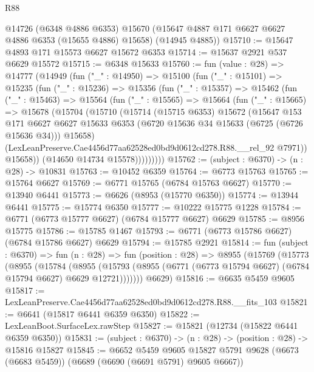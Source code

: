 \begin{lexlean}{R88}
\begin{coremodule}
      @14726
      (@6348 @4886 @6353)
      @15670
      (@15647 @4887 @171 @6627 @6627 @4886 @6353 (@15655 @4886) @15658)
      (@14945 @4885))
@15710 := @15647 @4893 @171 @15573 @6627 @15672 @6353
@15714 := @15637 @2921 @537 @6629 @15572
@15715 := @6348 @15633
@15760 := fun (value : @28) =>
  @14777
    (@14949
      (fun ("_" : @14950) =>
      @15100
        (fun ("_" : @15101) =>
        @15235
          (fun ("_" : @15236) =>
          @15356
            (fun ("_" : @15357) =>
            @15462
              (fun ("_" : @15463) =>
              @15564
                (fun ("_" : @15565) =>
                @15664
                  (fun ("_" : @15665) =>
                  @15678
                    (@15704
                      (@15710
                        (@15714
                          (@15715 @6353)
                          @15672
                          (@15647
                            @153
                            @171
                            @6627
                            @6627
                            @15633
                            @6353
                            (@6720 @15636 @34 @15633 (@6725 (@6726 @15636 @34)))
                            @15658)
                          (LexLeanPreserve.Cae4456d77aa62528ed0bd9d0612cd278.R88.__rel_92 @7971))
                        @15658))
                    (@14650 @14734 @15578)))))))))
@15762 := (subject : @6370) -> (n : @28) -> @10831
@15763 := @10452 @6359
@15764 := @6773 @15763
@15765 := @15764 @6627
@15769 := @6771 @15765 (@6784 @15763 @6627)
@15770 := @13940 @6441
@15773 := @6626 (@8953 (@15770 @6350))
@15774 := @13944 @6441
@15775 := @15774 @6350
@15777 := @10222 @15775 @1228
@15784 := @6771 (@6773 @15777 @6627) (@6784 @15777 @6627) @6629
@15785 := @8956 @15775
@15786 := @15785 @1467
@15793 := @6771 (@6773 @15786 @6627) (@6784 @15786 @6627) @6629
@15794 := @15785 @2921
@15814 := fun (subject : @6370) =>
  fun (n : @28) =>
  fun (position : @28) =>
  @8955
    (@15769
      (@15773
        (@8955
          (@15784
            (@8955
              (@15793 (@8955 (@6771 (@6773 @15794 @6627) (@6784 @15794 @6627) @6629 @12721)))))))
      @6629)
@15816 := @6635 @5459 @9605
@15817 := LexLeanPreserve.Cae4456d77aa62528ed0bd9d0612cd278.R88.__fits_103
@15821 := @6641 (@15817 @6441 @6359 @6350)
@15822 := LexLeanBoot.SurfaceLex.rawStep
@15827 := @15821 (@12734 (@15822 @6441 @6359 @6350))
@15831 := (subject : @6370) -> (n : @28) -> (position : @28) -> @15816 @15827
@15845 := @6652
    @5459
    @9605
    @15827
    @5791
    @9628
    (@6673 (@6683 @5459))
    (@6689 (@6690 (@6691 @5791) @9605 @6667))

\end{coremodule}
\end{lexlean}
